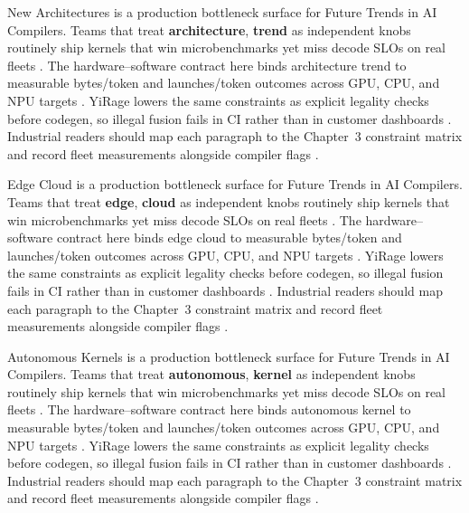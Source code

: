 New Architectures is a production bottleneck surface for Future Trends in AI Compilers. Teams that treat \textbf{architecture}, \textbf{trend} as independent knobs routinely ship kernels that win microbenchmarks yet miss decode SLOs on real fleets \citep{amd2024xdna,dao2022flashattention}. The hardware--software contract here binds architecture trend to measurable bytes/token and launches/token outcomes across GPU, CPU, and NPU targets \citep{amd2024aie,kwon2023vllm}. YiRage lowers the same constraints as explicit legality checks before codegen, so illegal fusion fails in CI rather than in customer dashboards \citep{dlbook,nvidia2024cudagraphs}. Industrial readers should map each paragraph to the Chapter~3 constraint matrix and record fleet measurements alongside compiler flags \citep{dao2022flashattention,liu2024deepseekv3}.

Edge Cloud is a production bottleneck surface for Future Trends in AI Compilers. Teams that treat \textbf{edge}, \textbf{cloud} as independent knobs routinely ship kernels that win microbenchmarks yet miss decode SLOs on real fleets \citep{amd2024aie,kwon2023vllm}. The hardware--software contract here binds edge cloud to measurable bytes/token and launches/token outcomes across GPU, CPU, and NPU targets \citep{dlbook,nvidia2024cudagraphs}. YiRage lowers the same constraints as explicit legality checks before codegen, so illegal fusion fails in CI rather than in customer dashboards \citep{dao2022flashattention,liu2024deepseekv3}. Industrial readers should map each paragraph to the Chapter~3 constraint matrix and record fleet measurements alongside compiler flags \citep{kwon2023vllm,patel2025llminference}.

Autonomous Kernels is a production bottleneck surface for Future Trends in AI Compilers. Teams that treat \textbf{autonomous}, \textbf{kernel} as independent knobs routinely ship kernels that win microbenchmarks yet miss decode SLOs on real fleets \citep{dlbook,nvidia2024cudagraphs}. The hardware--software contract here binds autonomous kernel to measurable bytes/token and launches/token outcomes across GPU, CPU, and NPU targets \citep{dao2022flashattention,liu2024deepseekv3}. YiRage lowers the same constraints as explicit legality checks before codegen, so illegal fusion fails in CI rather than in customer dashboards \citep{kwon2023vllm,patel2025llminference}. Industrial readers should map each paragraph to the Chapter~3 constraint matrix and record fleet measurements alongside compiler flags \citep{nvidia2024cudagraphs,taxbreak2026}.

